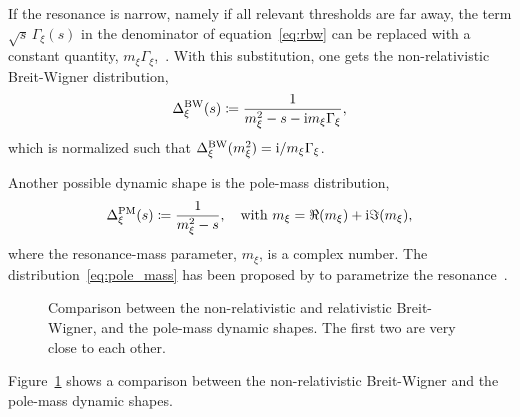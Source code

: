     If the resonance is narrow, namely if all relevant thresholds are far away, the term $\sqrt{s}\,\Gamma_\xi(s)$ in the denominator of equation~\eqref{eq:rbw} can be replaced with a constant quantity, $m_{\xi}\Gamma_{\xi}$,~\cite[\S~47.2.1]{chinese_phisics}.
    With this substitution, one gets the non-relativistic Breit-Wigner distribution,
    \begin{equation}\label{eq:bw}
        \Delta_{\xi}^{\text{BW}}(s) \coloneqq \frac{1}{m_{\xi}^2 - s - \mathrm{i} m_{\xi} \Gamma_{\xi}},
    \end{equation}
    which is normalized such that $\Delta_{\xi}^{\text{BW}}(m_{\xi}^2) = \mathrm{i} / m_\xi\Gamma_\xi$.


    Another possible dynamic shape is the pole-mass distribution,
    \begin{equation}\label{eq:pole_mass}
        \Delta_{\xi}^{\text{PM}}(s) \coloneqq \frac{1}{m_{\xi}^2 - s},\quad
        \text{with }m_\xi = \Re (m_\xi) + \mathrm{i}\Im(m_\xi),
    \end{equation}
    where the resonance-mass parameter, $m_\xi$, is a complex number.
    The distribution~\eqref{eq:pole_mass} has been proposed by \citeauthor{PhysRevD.71.054030} to parametrize the \Psigma{} resonance~\cite{PhysRevD.71.054030}.
    \begin{figure}
        \centering
        
        \caption{Comparison between the non-relativistic and relativistic Breit-Wigner, and the pole-mass dynamic shapes.
                 The first two are very close to each other.
        }
        \label{fig:bw_pm_comparison}
    \end{figure}
    Figure~\ref{fig:bw_pm_comparison} shows a comparison between the non-relativistic Breit-Wigner and the pole-mass dynamic shapes.

